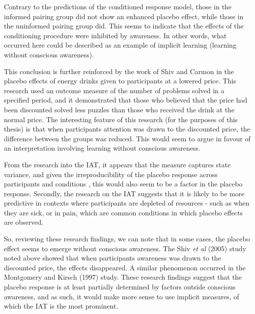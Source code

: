 Contrary to the predictions of the conditioned response model, those in the informed pairing group did not show an enhanced placebo effect, while those in the uninformed pairing group did. This seems to indicate that the effects of the conditioning procedure were inhibited by awareness. In other words, what occurred here could be described as an example of implicit learning (learning without conscious awareness).

This conclusion is further reinforced by the work of Shiv and Carmon \cite{Shiv2005a} in the placebo effects of energy drinks given to participants at a lowered price. This research used an outcome measure of the number of problems solved in a specified period, and it demonstrated that those who believed that the price had been discounted solved less puzzles than those who received the drink at the normal price. The interesting feature of this research (for the purposes of this thesis) is that when participants attention was drawn to the discounted price, the difference between the groups was reduced. This would seem to argue in favour of an interpretation involving learning without conscious awareness. 

From the research into the IAT, it appears that the measure captures state variance, and given the irreproducibility of the placebo response across participants and conditions \cite{Whalley2008,Shapiro1997}, this would also seem to be a factor in the placebo response. Secondly, the research on the IAT suggests that it is likely to be more predictive in contexts where participants are depleted of resources - such as when they are sick, or in pain, which are common conditions in which placebo effects are observed. 



So, reviewing these research findings, we can note that in some cases, the placebo effect seems to emerge without conscious awareness. The Shiv \textit{et al} (2005) study noted above showed that when participants awareness was drawn to the discounted price, the effects disappeared. A similar phenomenon occurred in the Montgomery and Kirsch (1997) \cite{Montgomery1997} study. These research findings suggest that the placebo response is at least partially determined by factors outside conscious awareness, and as such, it would make more sense to use implicit measures, of which the IAT is the most prominent. 

